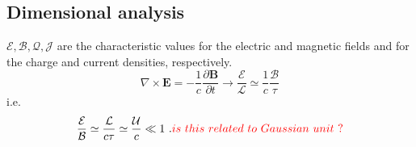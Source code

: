 \documentclass[12pt,a4paper]{article}
\renewcommand{\vec}[1]{\boldsymbol{#1}}
\begin{document}
\subsection{Dimensional analysis}
$\mathcal{E}, \mathcal{B}, \mathcal{Q}, \mathcal{J}$ are the characteristic values for the electric and magnetic fields and for the charge and current densities, respectively. 
\begin{equation*}
\nabla \times \vec{E} = -\frac{1}{c} \frac{\partial \vec{B}}{\partial t}  \longrightarrow \frac{\mathcal{E}}{\mathcal L} \simeq \frac{1}{c} \frac{\mathcal B}{\tau}
\end{equation*}
i.e.
\begin{equation}
\frac{\mathcal{E}}{\mathcal B} \simeq  \frac{\mathcal L}{c\tau} \simeq \frac{\mathcal U}{c} \ll 1 ~. \textcolor{red}{is~ this~ related~ to~ Gaussian~ unit ~?}
\end{equation}
\end{document}
